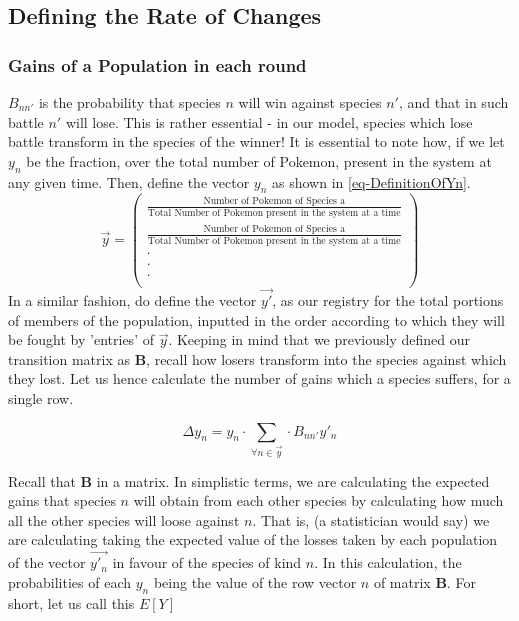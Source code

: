 \documentclass[border=1pt]{article}
\begin{document}
\subsection{Defining the Rate of Changes}
\subsubsection*{Gains of a Population in each round}
	$B_{nn'}$ is the probability that species $n$ will win against species $n'$, and that in such battle $n'$ will lose. This is rather essential - in our model, species which lose battle transform in the species of the winner! It is essential to note how, if we let $y_n$ be the fraction, over the total number of Pokemon, present in the system at any given time. Then, define the vector $y_n$ as shown in \autoref{eq-DefinitionOfYn}. 
	\begin{equation}
	\label{eq-DefinitionOfYn}
	\vec{y}=
		\begin{pmatrix}
			\frac{\text{Number of Pokemon of Species a}}{\text{Total Number of Pokemon present in the system at a time}}\\
			\frac{\text{Number of Pokemon of Species a}}{\text{Total Number of Pokemon present in the system at a time}}\\
			\cdot\\
			\cdot\\
			\cdot\\
		\end{pmatrix}
	\end{equation}
	In a similar fashion, do define the vector $\vec{y'}$, as our registry for the total portions of members of the population, inputted in the order according to which they will be fought by 'entries' of $\vec{y}$. Keeping in mind that we previously defined our transition matrix as $\mathbf{B}$, recall how losers transform into the species against which they lost. Let us hence calculate the number of gains which a species suffers, for a single row. 
	
	\begin{equation}
		\Delta y_n = y_n \cdot \sum_{\forall n \in \vec{y}} \cdot B_{nn'} y'_{n}
	\end{equation}


Recall that $\mathbf{B}$ in a matrix. In simplistic terms, we are calculating the expected gains that species $n$ will obtain from each other species by calculating how much all the other species will loose against $n$. That is, (a statistician would say) we are calculating taking the expected value of the losses taken by each population of the vector $\vec{y'_n}$ in favour of the species of kind $n$. In this calculation, the probabilities of each $y_n$ being the value of the row vector $n$ of matrix $\mathbf{B}$. For short, let us call this $E[Y]$
\end{document}
